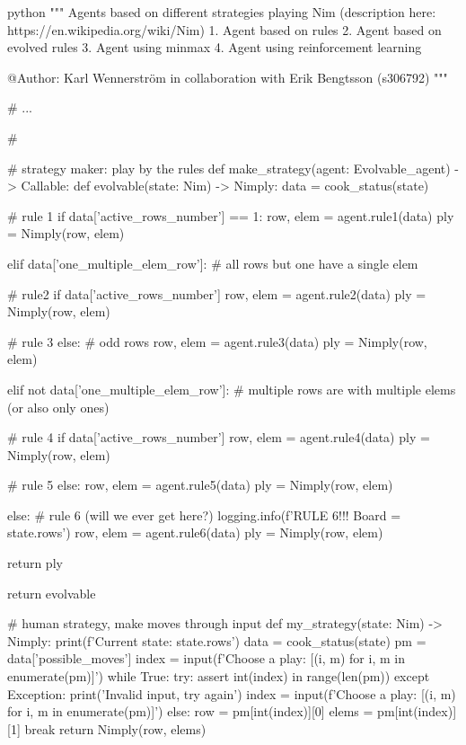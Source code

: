 \begin{mintedbox}{python}
    """
    Agents based on different strategies playing Nim (description here: https://en.wikipedia.org/wiki/Nim)
        1. Agent based on rules
        2. Agent based on evolved rules
        3. Agent using minmax
        4. Agent using reinforcement learning

    @Author: Karl Wennerström in collaboration with Erik Bengtsson (s306792)
    """

    # ...

    # %

    # strategy maker: play by the rules
    def make_strategy(agent: Evolvable_agent) -> Callable:
        def evolvable(state: Nim) -> Nimply:
            data = cook_status(state)

            # rule 1
            if data['active_rows_number'] == 1:
                row, elem = agent.rule1(data)
                ply = Nimply(row, elem)

            elif data['one_multiple_elem_row']:  # all rows but one have a single elem

                # rule2
                if data['active_rows_number'] %
                    row, elem = agent.rule2(data)
                    ply = Nimply(row, elem)

                # rule 3
                else:  # odd rows
                    row, elem = agent.rule3(data)
                    ply = Nimply(row, elem)

            elif not data['one_multiple_elem_row']:  # multiple rows are with multiple elems (or also only ones)

                # rule 4
                if data['active_rows_number'] %
                    row, elem = agent.rule4(data)
                    ply = Nimply(row, elem)

                # rule 5
                else:
                    row, elem = agent.rule5(data)
                    ply = Nimply(row, elem)


            else:
                # rule 6 (will we ever get here?)
                logging.info(f'RULE 6!!! Board = {state.rows}')
                row, elem = agent.rule6(data)
                ply = Nimply(row, elem)

            return ply

        return evolvable


    # human strategy, make moves through input
    def my_strategy(state: Nim) -> Nimply:
        print(f'Current state: {state.rows}')
        data = cook_status(state)
        pm = data['possible_moves']
        index = input(f'Choose a play: {[(i, m) for i, m in enumerate(pm)]}')
        while True:
            try:
                assert int(index) in range(len(pm))
            except Exception:
                print('Invalid input, try again')
                index = input(f'Choose a play: {[(i, m) for i, m in enumerate(pm)]}')
            else:
                row = pm[int(index)][0]
                elems = pm[int(index)][1]
                break
        return Nimply(row, elems)



\end{mintedbox}
